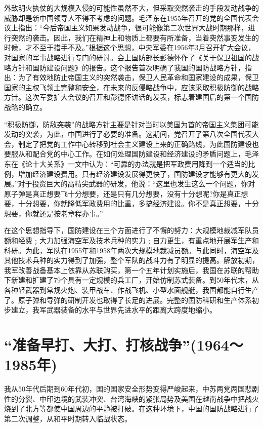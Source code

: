 \documentclass[UTF8, 12pt, a4paper]{ctexrep}
\begin{document}
外敌明火执仗的大规模入侵的可能性虽然不大，但采取突然袭击的手段发动战争的威胁却是新中国领导人不得不考虑的问题。毛泽东在1955年召开的党的全国代表会议上指出：“今后帝国主义如果发动战争，很可能像第二次世界大战时期那样，进行突然的袭击。因此，我们在精神上和物质上都要有所准备，当着突然事变发生的时候，才不至于措手不及。”根据这个思想，中央军委在1956年3月召开扩大会议，对国家的军事战略进行专门的研讨。会上国防部长彭德怀作了《关于保卫祖国的战略方针和国防建设问题》的报告。这个报告首次明确了我国的国防战略方针，指出：为了有效地防止帝国主义的突然袭击，保卫人民革命和国家建设的成果，保卫国家的主权飞领土完整和安全，在未来的反侵略战争中，应该采取积极防御的战略方针。这次军委扩大会议的召开和彭德怀讲话的发表，标志着建国后的第一个国防战略的确立。

“积极防御，防敌突袭”的战略方针主要是针对当时以美国为首的帝国主义集团可能发动的突袭，为此，中国进行了必要的准备。这期间，党召开了第八次全国代表大会，制定了把党的工作中心转移到社会主义建设上来的正确路线，为此国防建设也要服从和配合党的中心工作。在如何处理国防建设和经济建设的矛盾问题上，毛泽东在《论十大关系》一文中认为：“可靠的办法就是把军政费用降到一个适当的比例，增加经济建设费用。只有经济建设发展得更快了，国防建设才能够有更大的发展。”对于投资巨大的高精尖武器的研发，他说：“这里也发生这么一个问题，你对原子弹是真正想要飞十分想要，还是只有几分想要，没有十分想呢?你是真正想要，十分想要，你就降低军政费用的比重，多搞经济建设。你不是真正想要，十分想要，你就还是按老章程办事。”

在这个思想指导下，国防建设在三个方面进行了不懈的努力：大规模地裁减军队员额和经费﹔大力加强海空军及技术兵种的实力﹔自力更生，有重点地开展军生产和科研。为此，军队在1955年和1958年两次大规模地裁减员额。与此同时，海空军及其他技术兵种的实力得到了加强，整个军队的战斗力有了明显的提高。解放初期，我军改善战备基本上依靠从苏联购买，第一个五年计划实施后，我国在苏联的帮助下新建和扩建了79个具有一定规模的兵工厂，开始仿制苏式装备。到50年代末，从各种轻武器到常规火炮、装甲战车、作战飞机、小型水面舰艇，我国都能自行生产了。原子弹和导弹的研制开发也取得了长足的进展。完整的国防科研和生产体系初步建立，我军武器装备的水平与世界先进水平的距离大跨度地缩小。

\section{“准备早打、大打、打核战争”(1964～1985年)}

我从50年代后期到60年代初，国的国家安全形势变得严峻起来，中苏两党两国悲剧性的分裂、中印边境的武装冲突、台湾海峡的紧张局势及美国在越南战争中把战火烧到了北方等都使中国周边的平静被打破。在这种环境下，中国的国防战略进行了第二次调整，从和平时期转入临战状态。
\end{document}
